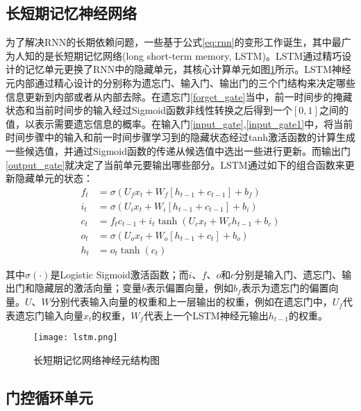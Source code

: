 \subsection{长短期记忆神经网络}

为了解决RNN的长期依赖问题，一些基于公式\ref{eq:rnn}的变形工作诞生，其中最广为人知的是长短期记忆网络(long short-term memory, LSTM)。LSTM通过精巧设计的记忆单元更换了RNN中的隐藏单元，其核心计算单元如图\ref{fig:lstm}所示。LSTM神经元内部通过精心设计的分别称为遗忘门、输⼊门、输出门的三个门结构来决定哪些信息更新到内部或者从内部去除。在遗忘门\eqref{forget_gate}当中，前一时间步的掩藏状态和当前时间步的输入经过Sigmoid函数非线性转换之后得到一个$[0,1]$之间的值，以表示需要遗忘信息的概率。在输入门\eqref{input_gate},\eqref{input_gate1}中，将当前时间步骤中的输入和前一时间步骤学习到的隐藏状态经过tanh激活函数的计算生成一些候选值，并通过Sigmoid函数的传递从候选值中选出一些进行更新。而输出门\eqref{output_gate}就决定了当前单元要输出哪些部分。LSTM通过如下的组合函数来更新隐藏单元的状态：
  \begin{align} 
  f_{t} &=\sigma(U_{f} x_{t}+W_{f}[h_{t-1}+ c_{t-1}] +b_{f}) \label{forget_gate}\\
  i_{t} &=\sigma(U_{i} x_{t}+W_{i}[h_{t-1}+ c_{t-1}]+b_{i}) \label{input_gate}\\  
  c_{t} &=f_{t} c_{t-1}+i_{t} \tanh (U_{c} x_{t}+W_{c} h_{t-1}+b_{c}) \label{input_gate1}\\ 
  o_{t} &=\sigma(U_{o} x_{t}+W_{o}[h_{t-1}+ c_{t}]+b_{o}) \label{output_gate}\\ 
  h_{t} &=o_{t} \tanh (c_{t}) 
  \end{align}

其中$\sigma(\cdot)$是Logistic Sigmoid激活函数；而$i$、$f$、$o$和$c$分别是输入门、遗忘门、输出门和隐藏层的激活向量；变量$b$表示偏置向量，例如$b_{f}$表示为遗忘门的偏置向量。$U$、$W$分别代表输入向量的权重和上一层输出的权重，例如在遗忘门中，$U_{f}$代表遗忘门输入向量$x_{t}$的权重，$W_{f}$代表上一个LSTM神经元输出$h_{t-1}$的权重。

\begin{figure}[htb]
  \centering
  \texttt{[image: lstm.png]}\\
  \caption{长短期记忆网络神经元结构图}
  \label{fig:lstm}
\end{figure}

\subsection{门控循环单元}


